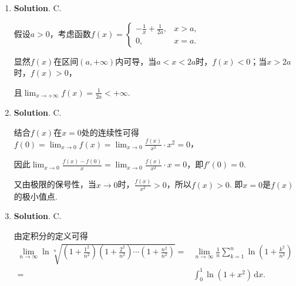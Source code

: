 \documentclass[../Main.tex]{subfiles}
\begin{document}
\begin{enumerate}
          则$x_{n} y_{n}\equiv0$，但$x_{n}$，$y_{n}$均无界，且$\lim_{n\to\infty}x_{n}$，$\lim
              _{n\to\infty}y_{n}$均不存在.

    \item \textbf{Solution}. C.

          假设$a>0$，考虑函数$f(x)=
              \begin{cases}
                  -\frac{1}{x}+\frac{1}{2a}, & x>a, \\
                  0,                         & x=a.
              \end{cases}$

          显然$f(x)$在区间$(a,+\infty)$内可导，当$a<x<2a$时，$f(x)<0$；当$x>2a$时，$f
              (x)>0$，

          且$\lim_{x\to+\infty}f(x)=\frac{1}{2a}<+\infty$.

    \item \textbf{Solution}. C.

          结合$f(x)$在$x=0$处的连续性可得$f(0)=\lim_{x\to0}f(x)=\lim_{x\to0}\frac{f(x)}{x^{2}}
              \cdot x^{2}=0$，

          因此$\lim_{x\to0}\frac{f(x)-f(0)}{x}=\lim_{x\to0}\frac{f(x)}{x^{2}}\cdot x=
              0$，即$f'(0)=0$.

          又由极限的保号性，当$x\to0$时，$\frac{f(x)}{x^{2}}>0$，所以$f(x)>0$. 即$x=0$是$f
              (x)$的极小值点.

    \item \textbf{Solution}. C.

          由定积分的定义可得
          \[
              \begin{aligned}
                  \lim_{n\to\infty}\ln\sqrt[n]{\left(1+\frac{1^2}{n^2}\right)\left(1+\frac{2^2}{n^2}\right)\cdots\left(1+\frac{n^2}{n^2}\right)}= & \lim_{n\to\infty}\frac{1}{n}\sum_{k=1}^{n}\ln\left(1+\frac{k^2}{n^2}\right) \\
                  =                                                                                                                               & \int_{0}^{1}\ln(1+x^{2})\,\mathrm{d}x.
              \end{aligned}
          \]
\end{enumerate}
\end{document}
